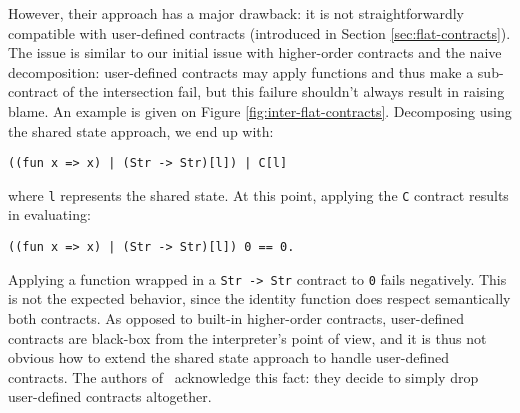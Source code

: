 \documentclass[sigplan,10pt,review,anonymous]{acmart}
\newcommand{\nickel}[1]{\lstinline[language=nickel]{#1}}
\begin{document}



However, their approach has a major drawback: it is not straightforwardly
compatible with user-defined contracts (introduced in Section
\ref{sec:flat-contracts}). The issue is similar to our initial issue with higher-order
contracts and the naive decomposition: user-defined contracts may apply
functions and thus make a sub-contract of the intersection fail, but this
failure shouldn't always result in raising blame. An example is given on Figure
\ref{fig:inter-flat-contracts}. Decomposing using the shared state approach, we
end up with:

\begin{lstlisting}[language=nickel,frame=none,numbers=none,title={Stateful
decomposition}]
((fun x => x) | (Str -> Str)[l]) | C[l]
\end{lstlisting}

where \nickel{l} represents the shared state.  At this point,
applying the \nickel{C} contract results in evaluating:

\begin{lstlisting}[language=nickel,frame=none,numbers=none]
((fun x => x) | (Str -> Str)[l]) 0 == 0.
\end{lstlisting}

Applying a function wrapped in a \nickel{Str -> Str} contract to \nickel{0}
fails negatively. This is not the expected behavior, since the identity function
does respect semantically both contracts. As opposed to built-in higher-order
contracts, user-defined contracts are black-box from the interpreter's point of
view, and it is thus not obvious how to extend the shared state approach to
handle user-defined contracts. The authors of~\cite{RootCauseOfBlame}
acknowledge this fact: they decide to simply drop user-defined contracts
altogether.
\end{document}
